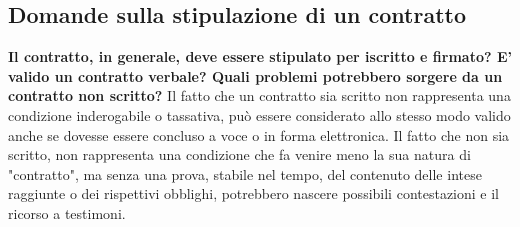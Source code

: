\subsection{Domande sulla stipulazione di un contratto}
\textbf{Il contratto, in generale, deve essere stipulato per iscritto e firmato?
E' valido un contratto verbale? Quali problemi potrebbero sorgere da un contratto non scritto?}
Il fatto che un contratto sia scritto non rappresenta una condizione
inderogabile o tassativa, può essere considerato allo stesso modo valido anche
se dovesse essere concluso a voce o in forma elettronica.
Il fatto che non sia scritto, non rappresenta una condizione che fa venire meno la
sua natura di "contratto", ma senza una prova, stabile nel tempo, del contenuto
delle intese raggiunte o dei rispettivi obblighi, potrebbero nascere possibili
contestazioni e il ricorso a testimoni.
